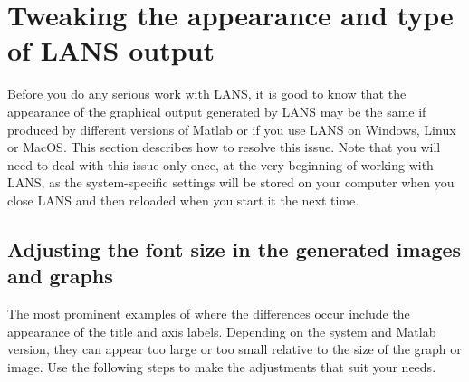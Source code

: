 \newpage
\section{Tweaking the appearance and type of LANS output}
\label{sec:appearance}

\purplebox{}
Before you do any serious work with LANS, it is good to know that the appearance of the graphical output generated by LANS may  be the same if produced by different versions of Matlab or if you use LANS on Windows, Linux or MacOS. This section describes how to resolve this issue. Note that you will need to deal with this issue only once, at the very beginning of working with LANS, as the system-specific settings will be stored on your computer when you close LANS and then reloaded when you start it the next time. 
\tcbe

\subsection{Adjusting the font size in the generated images and graphs}
\setcounter{step}{0}

\goldbox{}
The most prominent examples of where the differences occur include the appearance of the title and axis labels. Depending on the system and Matlab version, they can appear too large or too small relative to the size of the graph or image. Use the following steps to make the adjustments that suit your needs. 
\tcbe







